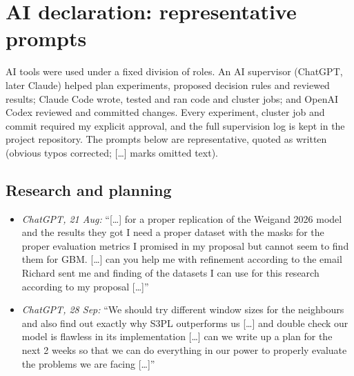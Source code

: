 \section*{AI declaration: representative prompts}
\small
AI tools were used under a fixed division of roles. An AI supervisor (ChatGPT,
later Claude) helped plan experiments, proposed decision rules and reviewed
results; Claude Code wrote, tested and ran code and cluster jobs; and OpenAI
Codex reviewed and committed changes. Every experiment, cluster job and commit
required my explicit approval, and the full supervision log is kept in the
project repository. The prompts below are representative, quoted as written
(obvious typos corrected; [\ldots] marks omitted text).

\subsection*{Research and planning}
\begin{itemize}
  \item \emph{ChatGPT, 21 Aug:} ``[\ldots] for a proper replication of the
        Weigand 2026 model and the results they got I need a proper dataset with
        the masks for the proper evaluation metrics I promised in my proposal
        but cannot seem to find them for GBM. [\ldots] can you help me with
        refinement according to the email Richard sent me and finding of the
        datasets I can use for this research according to my proposal [\ldots]''
  \item \emph{ChatGPT, 28 Sep:} ``We should try different window sizes for the
        neighbours and also find out exactly why S3PL outperforms us [\ldots]
        and double check our model is flawless in its implementation [\ldots]
        can we write up a plan for the next 2 weeks so that we can do everything
        in our power to properly evaluate the problems we are facing [\ldots]''
\end{itemize}

